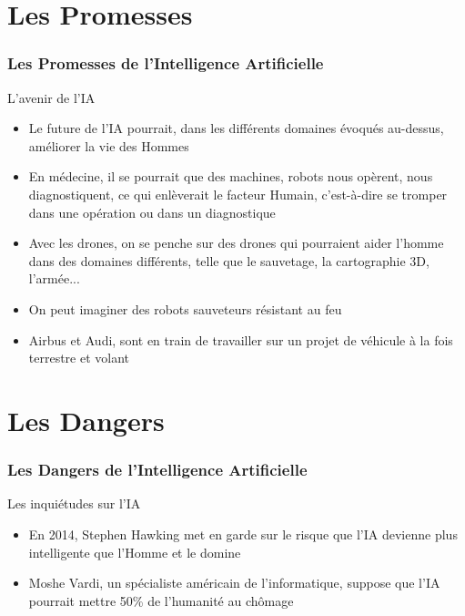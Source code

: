 \documentclass{beamer}
\begin{document}
	
	\section{Les Promesses}
	\begin{frame}
	\frametitle{Les Promesses de l'Intelligence Artificielle}
	\begin{block}{L'avenir de l'IA}
	\begin{itemize}
	\itemsep1em
		\item Le future de l'IA pourrait, dans les différents domaines évoqués au-dessus, améliorer la vie des Hommes
		\item En médecine, il se pourrait que des machines, robots nous opèrent, nous diagnostiquent, ce qui enlèverait le facteur Humain, c'est-à-dire se tromper dans une opération ou dans un diagnostique
		\item Avec les drones, on se penche sur des drones qui pourraient aider l'homme dans des domaines différents, telle que le sauvetage, la cartographie 3D, l'armée...
		\item On peut imaginer des robots sauveteurs résistant au feu
		\item Airbus et Audi, sont en train de travailler sur un projet de véhicule à la fois terrestre et volant
	\end{itemize}
	\end{block}
	\end{frame}	
	
	
	\section{Les Dangers}
	\begin{frame}
	\frametitle{Les Dangers de l'Intelligence Artificielle}
	\begin{block}{Les inquiétudes sur l'IA}
	\begin{itemize}
	\itemsep1em
		\item En 2014, Stephen Hawking met en garde sur le risque que l'IA devienne plus intelligente que l'Homme et le domine
		\item Moshe Vardi, un spécialiste américain de l'informatique, suppose que l'IA pourrait mettre 50\% de l'humanité au chômage
		\end{itemize}
	\end{block}

	\end{frame}
	
\end{document}
